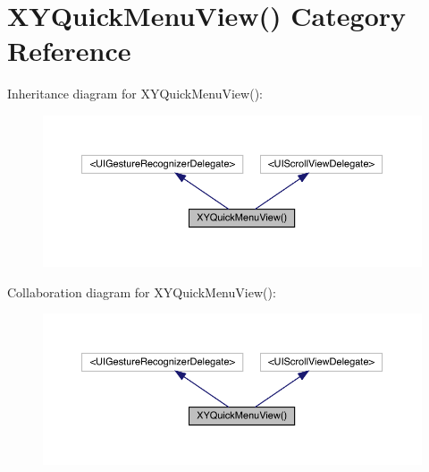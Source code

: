 \hypertarget{category_x_y_quick_menu_view_07_08}{}\section{X\+Y\+Quick\+Menu\+View() Category Reference}
\label{category_x_y_quick_menu_view_07_08}


Inheritance diagram for X\+Y\+Quick\+Menu\+View()\+:\nopagebreak
\begin{figure}[H]
\begin{center}
\leavevmode
\includegraphics[width=350pt]{category_x_y_quick_menu_view_07_08__inherit__graph}
\end{center}
\end{figure}


Collaboration diagram for X\+Y\+Quick\+Menu\+View()\+:\nopagebreak
\begin{figure}[H]
\begin{center}
\leavevmode
\includegraphics[width=350pt]{category_x_y_quick_menu_view_07_08__coll__graph}
\end{center}
\end{figure}
